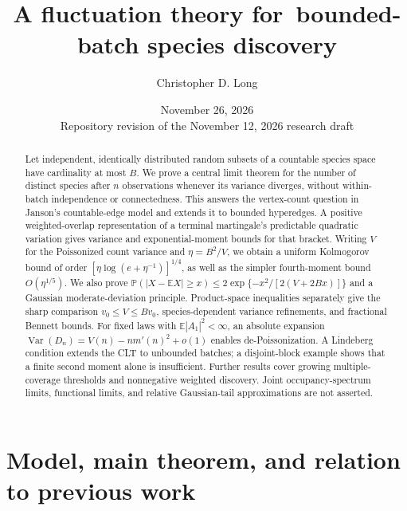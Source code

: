 \documentclass[11pt]{article}
\title{A fluctuation theory for\ bounded-batch species discovery}
\author{Christopher D. Long}
\date{November 26, 2026\\[3pt]\small Repository revision of the November 12, 2026 research draft}
\numberwithin{equation}{section}
\theoremstyle{definition}
\theoremstyle{remark}
\newcommand{\E}{\mathbb E}
\newcommand{\Pp}{\mathbb P}
\newcommand{\Var}{\operatorname{Var}}
\begin{document}
\maketitle
\begin{abstract}
Let independent, identically distributed random subsets of a countable species
space have cardinality at most $B$. We prove a central limit theorem for the
number of distinct species after $n$ observations whenever its variance diverges,
without within-batch independence or connectedness. This answers the vertex-count
question in Janson's countable-edge model and extends it to bounded hyperedges.
A positive weighted-overlap representation of a terminal martingale's predictable
quadratic variation gives variance and exponential-moment bounds for that bracket.
Writing $V$ for the Poissonized count variance and $\eta=B^2/V$, we obtain a
uniform Kolmogorov bound of order $[\eta\log(e+\eta^{-1})]^{1/4}$, as well as
the simpler fourth-moment bound $O(\eta^{1/5})$. We also prove
$\Pp(|X-\E X|\ge x)\le2\exp\{-x^2/[2(V+2Bx)]\}$ and a Gaussian
moderate-deviation principle. Product-space inequalities separately give the
sharp comparison $v_0\le V\le Bv_0$, species-dependent variance refinements,
and fractional Bennett bounds. For fixed laws with $\E|A_1|^2<\infty$, an
absolute expansion $\Var(D_n)=V(n)-n m'(n)^2+o(1)$ enables de-Poissonization.
A Lindeberg condition extends the CLT to unbounded batches; a disjoint-block
example shows that a finite second moment alone is insufficient. Further results
cover growing multiple-coverage thresholds and nonnegative weighted discovery.
Joint occupancy-spectrum limits, functional limits, and relative Gaussian-tail
approximations are not asserted.
\end{abstract}

\setcounter{tocdepth}{1}
{\small\tableofcontents}
\clearpage

\section{Model, main theorem, and relation to previous work}\label{sec:intro}
\end{document}
